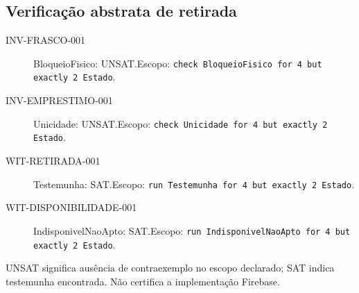 \subsection*{Verificação abstrata de retirada}
\begin{description}
\item[INV-FRASCO-001] BloqueioFisico: UNSAT.\newline Escopo: \texttt{check BloqueioFisico for 4 but exactly 2 Estado}.
\item[INV-EMPRESTIMO-001] Unicidade: UNSAT.\newline Escopo: \texttt{check Unicidade for 4 but exactly 2 Estado}.
\item[WIT-RETIRADA-001] Testemunha: SAT.\newline Escopo: \texttt{run Testemunha for 4 but exactly 2 Estado}.
\item[WIT-DISPONIBILIDADE-001] IndisponivelNaoApto: SAT.\newline Escopo: \texttt{run IndisponivelNaoApto for 4 but exactly 2 Estado}.
\end{description}
UNSAT significa ausência de contraexemplo no escopo declarado; SAT indica testemunha encontrada. Não certifica a implementação Firebase.
